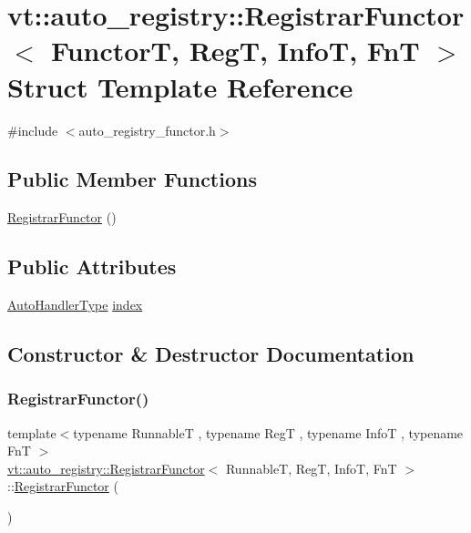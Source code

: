 \hypertarget{structvt_1_1auto__registry_1_1_registrar_functor}{}\section{vt\+:\+:auto\+\_\+registry\+:\+:Registrar\+Functor$<$ FunctorT, RegT, InfoT, FnT $>$ Struct Template Reference}
\label{structvt_1_1auto__registry_1_1_registrar_functor}


{\ttfamily \#include $<$auto\+\_\+registry\+\_\+functor.\+h$>$}

\subsection*{Public Member Functions}
\begin{DoxyCompactItemize}
\item 
\hyperlink{structvt_1_1auto__registry_1_1_registrar_functor_a8635931ab8c816bd71566527c2e77d12}{Registrar\+Functor} ()
\end{DoxyCompactItemize}
\subsection*{Public Attributes}
\begin{DoxyCompactItemize}
\item 
\hyperlink{namespacevt_1_1auto__registry_ae295e18699146815bb7d7674594d95d7}{Auto\+Handler\+Type} \hyperlink{structvt_1_1auto__registry_1_1_registrar_functor_a02d2f38340b9b6846ac3ec7b77fdcd4f}{index}
\end{DoxyCompactItemize}


\subsection{Constructor \& Destructor Documentation}
\mbox{\label{structvt_1_1auto__registry_1_1_registrar_functor_a8635931ab8c816bd71566527c2e77d12}} 
\subsubsection{\texorpdfstring{Registrar\+Functor()}{RegistrarFunctor()}}
{\footnotesize\ttfamily template$<$typename RunnableT , typename RegT , typename InfoT , typename FnT $>$ \\
\hyperlink{structvt_1_1auto__registry_1_1_registrar_functor}{vt\+::auto\+\_\+registry\+::\+Registrar\+Functor}$<$ RunnableT, RegT, InfoT, FnT $>$\+::\hyperlink{structvt_1_1auto__registry_1_1_registrar_functor}{Registrar\+Functor} (\begin{DoxyParamCaption}{ }\end{DoxyParamCaption})}



